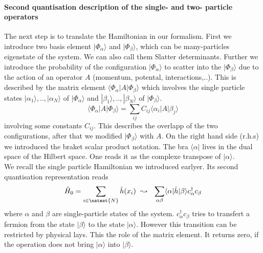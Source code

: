 \documentclass[../main.tex]{subfile}
\begin{document}
\paragraph{Second quantisation description of the single- and two- particle operators}$~$\\
The next step is to translate the Hamiltonian in our formalism.
First we introduce two basis element $|\Phi_{\alpha}\rangle$ and $|\Phi_{\beta}\rangle$, which can be many-particles eigenstate of the system.
We can also call them Slatter determinants.
Further we introduce the probability of the configuration $|\Phi_{\alpha}\rangle$ to scatter into the $|\Phi_{\beta}\rangle$ due to the action of an operator $A$ (momentum, potental, interactions,..).
This is described by the matrix element $\langle\Phi_{\alpha}|A|\Phi_{\beta}\rangle$ which involves the single particle states $|\alpha_1\rangle, .., |\alpha_N\rangle$ of $|\Phi_{\alpha}\rangle$
and $|\beta_1\rangle, ..,|\beta_N\rangle$ of $|\Phi_{\beta}\rangle$.
\[
    \langle\Phi_{\alpha}|A|\Phi_{\beta}\rangle = \sum_{ij} C_{ij}\langle\alpha_i|A|\beta_j\rangle
\]
involving some constants $C_{ij}$. This describes the overlapp of the two configurations, after that we modified $|\Phi_{\beta}\rangle$ with $A$.
On the right hand side (r.h.s) we introduced the braket scalar product notation. The bra $\langle\alpha|$ lives in the dual space
of the Hilbert space. One reads it as the complexe transpose of $|\alpha\rangle$.\\

We recall the single particle Hamiltonian we introduced earlyer. Its second quantisation representation reads
\begin{equation}\label{eq:SecondQuantisationSingleParticle}
    \hat{H}_0 = \sum_{i \in \natset{N}} \hat{h}(x_i) ~ \leadsto ~~ \sum_{\alpha\beta} \langle \alpha|\hat{h}|\beta\rangle c_{\alpha}^{\dagger}c_{\beta}
\end{equation}
where $\alpha$ and $\beta$ are single-particle states of the system. $c_{\alpha}^{\dagger}c_{\beta}$ tries to transfert a fermion
from the state $|\beta\rangle$ to the state $|\alpha\rangle$. However this transition can be restricted by physical lays. This the role of the matrix element.
It returns zero, if the operation does not bring $|\alpha\rangle$ into $|\beta\rangle$.\\
\end{document}
